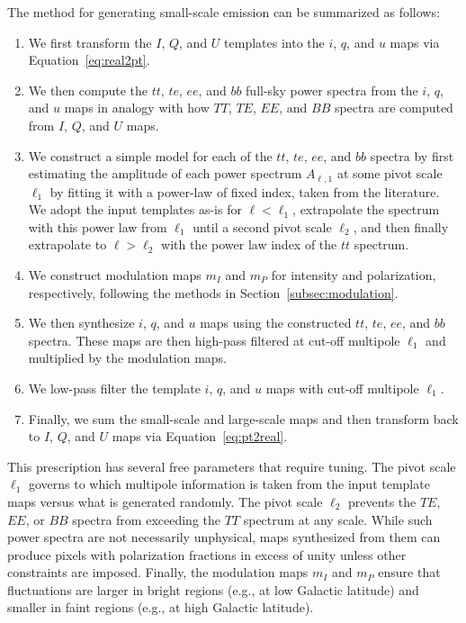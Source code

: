 The method for generating small-scale emission can be summarized as follows: 
\begin{enumerate}
    \item We first transform the $I$, $Q$, and $U$ templates into the $i$, $q$, and $u$ maps via Equation~\eqref{eq:real2pt}. 
    \item We then compute the $tt$, $te$, $ee$, and $bb$ full-sky power spectra from the $i$, $q$, and $u$ maps in analogy with how $TT$, $TE$, $EE$, and $BB$ spectra are computed from $I$, $Q$, and $U$ maps. 
    \item We construct a simple model for each of the $tt$, $te$, $ee$, and $bb$ spectra by first estimating the amplitude of each power spectrum $A_{\ell, 1}$ at some pivot scale $\ell_1$ by fitting it with a power-law of fixed index, taken from the literature. We adopt the input templates as-is for $\ell < \ell_1$, extrapolate the spectrum with this power law from $\ell_1$ until a second pivot scale $\ell_2$, and then finally extrapolate to $\ell > \ell_2$ with the power law index of the $tt$ spectrum.
    \item We construct modulation maps $m_I$ and $m_P$ for intensity and polarization, respectively, following the methods in Section~\ref{subsec:modulation}.
    \item We then synthesize $i$, $q$, and $u$ maps using the constructed $tt$, $te$, $ee$, and $bb$ spectra. These maps are then high-pass filtered at cut-off multipole $\ell_1$ and multiplied by the modulation maps. 
    \item We low-pass filter the template $i$, $q$, and $u$ maps with cut-off multipole $\ell_1$. 
    \item Finally, we sum the small-scale and large-scale maps and then transform back to $I$, $Q$, and $U$ maps via Equation~\eqref{eq:pt2real}. 
\end{enumerate}

This prescription has several free parameters that require tuning. The pivot scale $\ell_1$ governs to which multipole information is taken from the input template maps versus what is generated randomly. The pivot scale $\ell_2$ prevents the $TE$, $EE$, or $BB$ spectra from exceeding the $TT$ spectrum at any scale. While such power spectra are not necessarily unphysical, maps synthesized from them can produce pixels with polarization fractions in excess of unity unless other constraints are imposed. Finally, the modulation maps $m_I$ and $m_P$ ensure that fluctuations are larger in bright regions (e.g., at low Galactic latitude) and smaller in faint regions (e.g., at high Galactic latitude).

